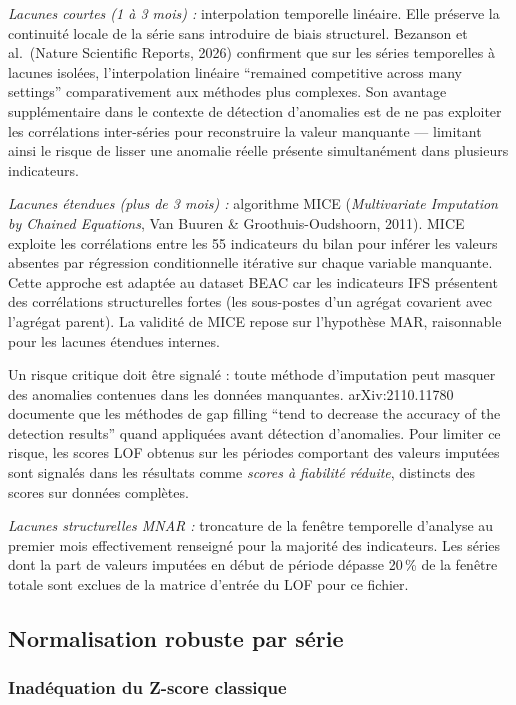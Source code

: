 \documentclass[12pt,a4paper]{article}
\begin{document}
\textit{Lacunes courtes (1 à 3 mois) :} interpolation temporelle linéaire.
Elle préserve la continuité locale de la série sans introduire de biais
structurel. Bezanson et al.\ (Nature Scientific Reports, 2026) confirment
que sur les séries temporelles à lacunes isolées, l'interpolation linéaire
``remained competitive across many settings'' comparativement aux méthodes
plus complexes. Son avantage supplémentaire dans le contexte de détection
d'anomalies est de ne pas exploiter les corrélations inter-séries pour
reconstruire la valeur manquante --- limitant ainsi le risque de lisser une
anomalie réelle présente simultanément dans plusieurs indicateurs.

\textit{Lacunes étendues (plus de 3 mois) :} algorithme MICE
(\textit{Multivariate Imputation by Chained Equations}, Van Buuren \&
Groothuis-Oudshoorn, 2011). MICE exploite les corrélations entre les 55
indicateurs du bilan pour inférer les valeurs absentes par régression
conditionnelle itérative sur chaque variable manquante. Cette approche est
adaptée au dataset BEAC car les indicateurs IFS présentent des corrélations
structurelles fortes (les sous-postes d'un agrégat covarient avec l'agrégat
parent). La validité de MICE repose sur l'hypothèse MAR, raisonnable pour
les lacunes étendues internes.

Un risque critique doit être signalé : toute méthode d'imputation peut masquer
des anomalies contenues dans les données manquantes. arXiv:2110.11780 documente
que les méthodes de gap filling ``tend to decrease the accuracy of the detection
results'' quand appliquées avant détection d'anomalies. Pour limiter ce risque,
les scores LOF obtenus sur les périodes comportant des valeurs imputées sont
signalés dans les résultats comme \textit{scores à fiabilité réduite}, distincts
des scores sur données complètes.

\textit{Lacunes structurelles MNAR :} troncature de la fenêtre temporelle
d'analyse au premier mois effectivement renseigné pour la majorité des
indicateurs. Les séries dont la part de valeurs imputées en début de période
dépasse 20\,\% de la fenêtre totale sont exclues de la matrice d'entrée du
LOF pour ce fichier.

\subsection{Normalisation robuste par série}

\subsubsection{Inadéquation du Z-score classique}
\end{document}
